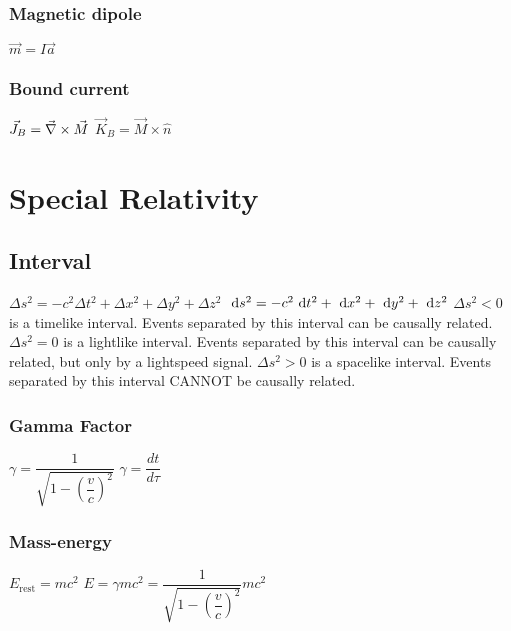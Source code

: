 \subsubsection{Magnetic dipole}
\begin{itemize}
\itemt \( \vec{m} = I\vec{a} \)
\end{itemize}

\subsubsection{Bound current}
\begin{itemize}
\itemt \( \vec{J}_B = \vec{\nabla}\times \vec{M} \)
\itemt \( \vec{K}_B = \vec{M}\times\hat{n} \)
\end{itemize}


	\section{Special Relativity}

\subsection{Interval}
\begin{itemize}
\itemt \( \Delta s^2 = -c^2\Delta t^2 + \Delta x^2 +\Delta y^2 +\Delta z^2 \)
\itemt \( \ \mathrm{d}s^2 = -c^2\ \mathrm{d}t^2 + \ \mathrm{d}x^2 + \ \mathrm{d}y^2 + \ \mathrm{d}z^2 \)
\itemt \( \Delta s^2 < 0 \) is a timelike interval. Events separated by this interval can be causally related.
\itemt \( \Delta s^2 = 0 \) is a lightlike interval. Events separated by this interval can be causally related, but only by a lightspeed signal.
\itemt \( \Delta s^2 > 0 \) is a spacelike interval. Events separated  by this interval CANNOT be causally related.
\end{itemize}

\subsubsection{Gamma Factor}		
\begin{itemize}
\itemt \( \gamma = \dfrac{1}{\sqrt{1-(\dfrac{v}{c})^2}} \)
\itemt \( \gamma = \dfrac{dt}{d\tau} \)
\end{itemize}		

\subsubsection{Mass-energy}
\begin{itemize}
\itemt \( E_\mathrm{rest} = mc^2\)
\itemt \( E = \gamma mc^2 = \dfrac{1}{\sqrt{1-(\dfrac{v}{c})^2}}mc^2 \)
\end{itemize}

